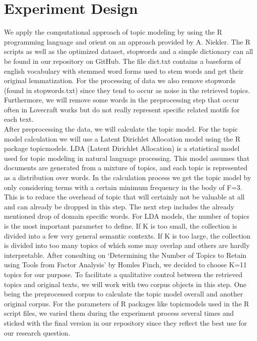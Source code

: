 \section{Experiment Design}

We apply the computational approach of topic modeling by using the R programming language and orient
on an approach provided by A. Niekler. The R scripts as well as the optimized dataset, stopwords and 
a simple dictionary can all be found in our repository on GitHub. The file dict.txt contains a baseform 
of english vocabulary with stemmed word forms used to stem words and get their original lemmatization. 
For the processing of data we also remove stopwords (found in stopwords.txt) since they tend to occur 
as noise in the retrieved topics. Furthermore, we will remove some words in the preprocessing step 
that occur often in Lovecraft works but do not really represent specific related motifs for each text.\\

After preprocessing the data, we will calculate the topic model. For the topic model calculation we 
will use a Latent Dirichlet Allocation model using the R package topicmodels. LDA (Latent Dirichlet 
Allocation) is a statistical model used for topic modeling in natural language processing. This model 
assumes that documents are generated from a mixture of topics, and each topic is represented as a 
distribution over words. In the calculation process we get the topic model by only considering terms
with a certain minimum frequency in the body of F=3. This is to reduce the overhead of topic that
will certainly not be valuable at all and can already be dropped in this step. The next step 
includes the already mentioned drop of domain specific words. For LDA models, the number of topics 
is the most important parameter to define. If K is too small, the collection is divided into a few very 
general semantic contexts. If K is too large, the collection is divided into too many topics of which some 
may overlap and others are hardly interpretable. After consulting on ‘Determining the Number of Topics to 
Retain using Tools from Factor Analysis’ by Homles Finch, we decided to choose K=11 topics for our purpose. 
To facilitate a qualitative control between the retrieved topics and original texts, we will work with two 
corpus objects in this step. One being the preprocessed corpus to calculate the topic model overall and 
another original corpus. For the parameters of R packages like topicmodels used in the R script files, 
we varied them during the experiment process several times and sticked with the final version in our 
repository since they reflect the best use for our research question.\\

